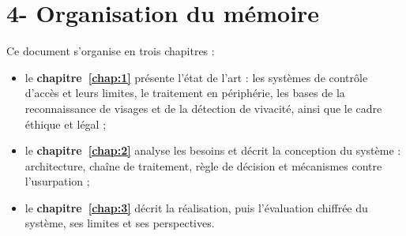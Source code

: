 \section*{4- Organisation du mémoire}

Ce document s'organise en trois chapitres :
\begin{itemize}
  \item le \textbf{chapitre~\ref{chap:1}} présente l'état de l'art : les systèmes de contrôle d'accès et leurs limites, le traitement en périphérie, les bases de la reconnaissance de visages et de la détection de vivacité, ainsi que le cadre éthique et légal ;
  \item le \textbf{chapitre~\ref{chap:2}} analyse les besoins et décrit la conception du système : architecture, chaîne de traitement, règle de décision et mécanismes contre l'usurpation ;
  \item le \textbf{chapitre~\ref{chap:3}} décrit la réalisation, puis l'évaluation chiffrée du système, ses limites et ses perspectives.
\end{itemize}
